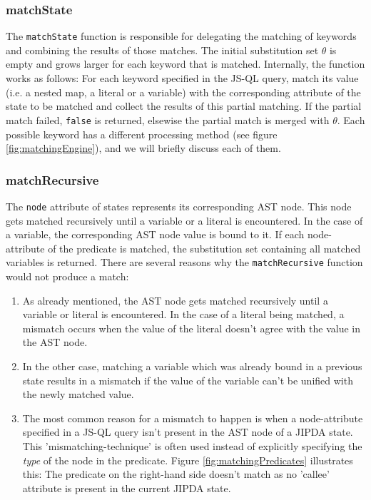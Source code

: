 \subsubsection{matchState}
The \texttt{matchState} function is responsible for delegating the matching of keywords and combining the results of those matches. The initial substitution set $\theta$ is empty and grows larger for each keyword that is matched. Internally, the function works as follows: For each keyword specified in the JS-QL query, match its value (i.e. a nested map, a literal or a variable) with the corresponding attribute of the state to be matched and collect the results of this partial matching. If the partial match failed, \texttt{false} is returned, elsewise the partial match is merged with $\theta$. Each possible keyword has a different processing method (see figure \ref{fig:matchingEngine}), and we will briefly discuss each of them.

\subsubsection{matchRecursive}
The \texttt{node} attribute of states represents its corresponding AST node. This node gets matched recursively until a variable or a literal is encountered. In the case of a variable, the corresponding AST node value is bound to it. If each node-attribute of the predicate is matched, the substitution set containing all matched variables is returned. There are several reasons why the \texttt{matchRecursive} function would not produce a match:
\begin{enumerate}
\item As already mentioned, the AST node gets matched recursively until a variable or literal is encountered. In the case of a literal being matched, a mismatch occurs when the value of the literal doesn't agree with the value in the AST node.
\item In the other case, matching a variable which was already bound in a previous state results in a mismatch if the value of the variable can't be unified with the newly matched value.
\item The most common reason for a mismatch to happen is when a node-attribute specified in a JS-QL query isn't present in the AST node of a JIPDA state. This 'mismatching-technique' is often used instead of explicitly specifying the \textit{type} of the node in the predicate. Figure \ref{fig:matchingPredicates} illustrates this: The predicate on the right-hand side doesn't match as no 'callee' attribute is present in the current JIPDA state.
\end{enumerate}

